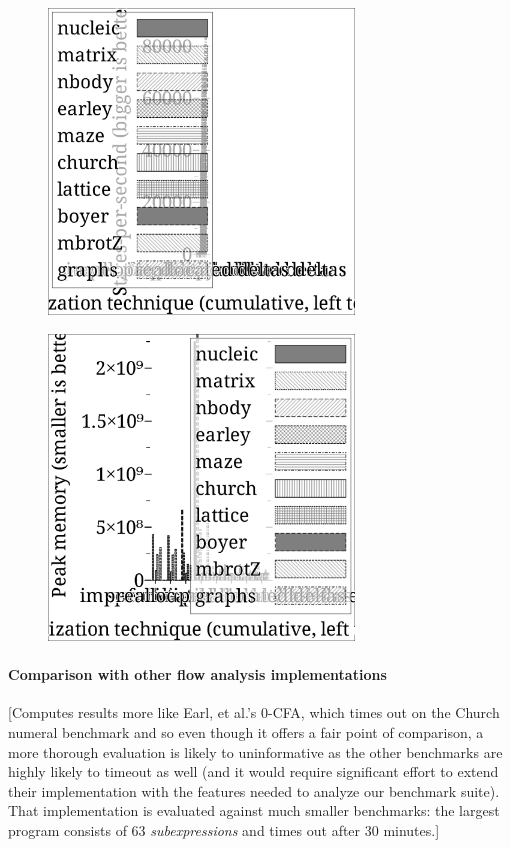 \documentclass[preprint,onecolumn,9pt]{sigplanconf} %
\begin{document}
\begin{figure}
\begin{center}
\includegraphics[width=3.2in]{state-per-sec.ps}
\end{center}
\end{figure}

\begin{figure}
\begin{center}
\includegraphics[width=3.2in]{peak-mem.ps}
\end{center}
\end{figure}

\paragraph{Comparison with other flow analysis implementations}

[Computes results more like Earl, et al.'s 0-CFA, which times out on
  the Church numeral benchmark and so even though it offers a fair
  point of comparison, a more thorough evaluation is likely to
  uninformative as the other benchmarks are highly likely to timeout
  as well (and it would require significant effort to extend their
  implementation with the features needed to analyze our benchmark
  suite).  That implementation is evaluated against much smaller
  benchmarks: the largest program consists of 63 \emph{subexpressions}
  and times out after 30 minutes.]
\end{document}
